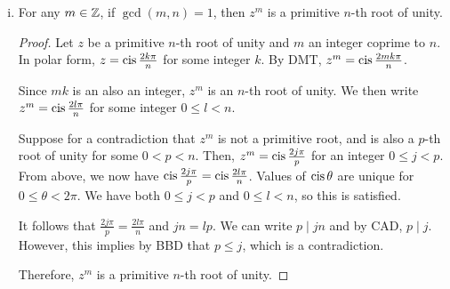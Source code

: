 \begin{enumerate}[(a)]
\begin{enumerate}[i.]
\begin{proof}
                  If $r=0$, then $j = qn$ and $j \mid n$.
                  Otherwise, we have $1 \leq r \leq n-1$ and $z^r = 1$, which is a contradiction
                  to the fact that $z$ is a primitive $n$-th root of unity.

                  Therefore, $r = 0$ and $j \mid n$.

                  ($\Larr$) If $n \mid j$ and $j = nk$ for an integer $k$,
                  then $z^j = z^{nk} = (z^n)^k = 1^k = 1$.
                \end{proof}
          \item For any $m\in\mathbb{Z}$, if $\gcd(m,n)=1$, then $z^m$ is a primitive $n$-th root of unity.
                \begin{proof}
                  Let $z$ be a primitive $n$-th root of unity and $m$ an integer coprime to $n$.
                  In polar form, $z = \operatorname{cis} \frac{2k\pi}{n}$ for some integer $k$.
                  By DMT, $z^m = \operatorname{cis} \frac{2mk\pi}{n}$.

                  Since $mk$ is an also an integer, $z^m$ is an $n$-th root of unity.
                  We then write $z^m = \operatorname{cis} \frac{2l\pi}{n}$ for some integer $0 \leq l < n$.

                  Suppose for a contradiction that $z^m$ is not a primitive root,
                  and is also a $p$-th root of unity for some $0 < p < n$.
                  Then, $z^m = \operatorname{cis} \frac{2j\pi}{p}$ for an integer $0 \leq j < p$.
                  From above, we now have $\operatorname{cis}\frac{2j\pi}{p} = \operatorname{cis}\frac{2l\pi}{n}$.
                  Values of $\operatorname{cis} \theta$ are unique for $0 \leq \theta < 2\pi$.
                  We have both $0 \leq j < p$ and $0 \leq l < n$, so this is satisfied.

                  It follows that $\frac{2j\pi}{p} = \frac{2l\pi}{n}$ and $jn = lp$.
                  We can write $p \mid jn$ and by CAD, $p \mid j$.
                  However, this implies by BBD that $p \leq j$, which is a contradiction.

                  Therefore, $z^m$ is a primitive $n$-th root of unity.
                \end{proof}
        \end{enumerate}
\end{enumerate}


